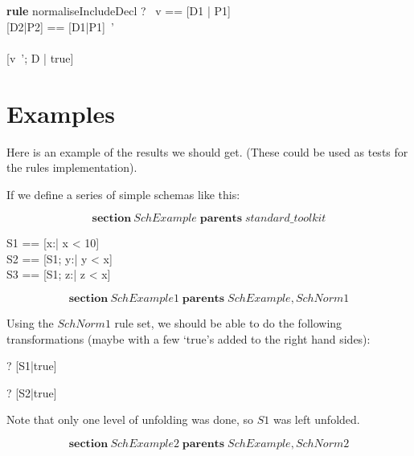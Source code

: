 \documentclass{article}
\newenvironment{zsection}{\[}{\]}
\newcommand{\SECTION}{\textbf{section}~}
\newcommand{\parents}{\mathrel{\textbf{parents}}}
\newenvironment{zedrule}[1]{\par\textbf{rule }#1\vspace{-1ex}\infrule}{\endinfrule}
\newcommand{\derives}{\derive{}}
\newcommand{\proviso}{\raisebox{0.5ex}{${}_{\blacktriangleright}\ $}}%
\begin{document}
\begin{zedrule}{normaliseIncludeDecl}
   \proviso ?~ v == [D1 | P1] \\
   \proviso [D2|P2] == [D1|P1]~' \\
   [D | true] \unfoldsTo [D3 | P3] \\
\derives
   [v~'; D | true] \unfoldsTo [D2;D3 | P2 \land P3]
\end{zedrule}



\section*{Examples}
Here is an example of the results we should get.
(These could be used as tests for the rules implementation).

If we define a series of simple schemas like this:

\begin{zsection}
  \SECTION SchExample \parents standard\_toolkit 
\end{zsection}

\begin{zed}
  S1 == [x:\nat | x < 10] \\
  S2 == [S1; y:\nat | y < x] \\
  S3 == [S1; z:\nat | z < x]
\end{zed}


\begin{zsection}
  \SECTION SchExample1 \parents SchExample, SchNorm1
\end{zsection}

Using the $SchNorm1$ rule set, we should be able to
do the following transformations (maybe with a few
`true's added to the right hand sides):

\begin{zed}
\vdash? [S1|true] \unfoldsTo [x:\nat | x<10]
\end{zed}
\begin{zed}
\vdash? [S2|true] \unfoldsTo [S1; y:\nat | y<x]
\end{zed}

Note that only one level of unfolding was done, so $S1$ was left unfolded.



\begin{zsection}
  \SECTION SchExample2 \parents SchExample, SchNorm2
\end{zsection}
\end{document}
